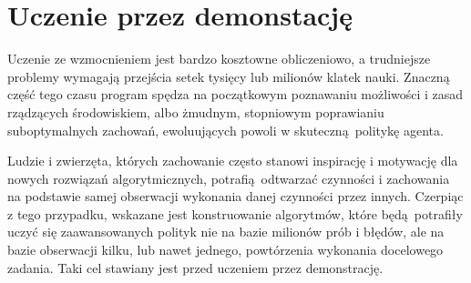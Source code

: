 \section{Uczenie przez demonstację}\label{imitation_learning}
Uczenie ze wzmocnieniem jest bardzo kosztowne obliczeniowo, a trudniejsze problemy wymagają przejścia setek tysięcy lub milionów klatek nauki. Znaczną część tego czasu program spędza na początkowym poznawaniu możliwości i zasad rządzących środowiskiem, albo żmudnym, stopniowym poprawianiu suboptymalnych zachowań, ewoluujących powoli w skuteczną politykę agenta.

Ludzie i zwierzęta, których zachowanie często stanowi inspirację i motywację dla nowych rozwiązań algorytmicznych, potrafią odtwarzać czynności i zachowania na podstawie samej obserwacji wykonania danej czynności przez innych. Czerpiąc z tego przypadku, wskazane jest konstruowanie algorytmów, które będą potrafiły uczyć się zaawansowanych polityk nie na bazie milionów prób i błędów, ale na bazie obserwacji kilku, lub nawet jednego, powtórzenia wykonania docelowego zadania. Taki cel stawiany jest przed uczeniem przez demonstrację.

